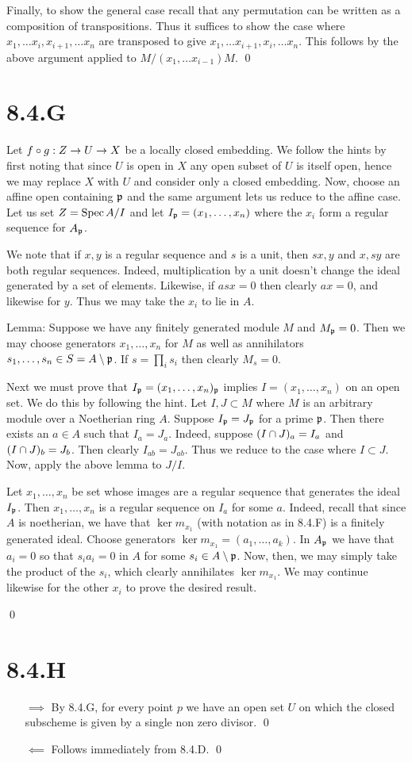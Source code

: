 \documentclass{article}
\begin{document}
Finally, to show the general case recall that any permutation can be written as
a composition of transpositions. Thus it suffices to show the case where
$x_1, \dots x_i, x_{i+1}, \dots x_n$ are transposed to give $x_1, \dots x_{i+1}, x_{i},
    \dots x_n$. This
follows by the above argument applied to $M/(x_1, \dots x_{i-1})M$. \qed

\section{8.4.G}
Let $f \circ g: Z \to U \to X$ be a locally closed embedding. We follow the hints
by first noting that since $U$ is open in
$X$ any open subset of $U$ is itself
open, hence we may replace $X$ with $U$
and consider only a closed embedding. Now, choose an affine open containing
$\mathfrak{p}$ and the same argument lets us reduce to the affine
case. Let us set $Z=\operatorname{Spec} A/I$ and let $I_{\mathfrak{p}}=(x_1, \dots, x_n)$ where
the $x_i$ form a regular sequence for
$A_{\mathfrak{p}}$.

We note that if $x, y$ is a regular sequence and
$s$ is a unit, then $sx, y$ and
$x, sy$ are both regular sequences. Indeed, multiplication by a
unit doesn't change the ideal generated by a set of elements. Likewise, if
$asx=0$ then clearly $ax=0$, and likewise for
$y$. Thus we may take the $x_i$ to lie in
$A$.

Lemma: Suppose we have any finitely generated module $M$
and $M_{\mathfrak{p}}=0$. Then we may choose generators
$x_1, \dots, x_n$ for $M$ as well as annihilators
$s_1, \dots, s_n \in S = A \setminus \mathfrak{p}$. If $s=\prod_i s_i$ then clearly
$M_s=0$.

Next we must prove that $I_{\mathfrak{p}}=(x_1, \dots,
    x_n)_{\mathfrak{p}}$ implies $I=(x_1, \dots, x_n)$
on an open set. We do this by following the hint. Let $I, J \subset M$
where $M$ is an arbitrary module over a Noetherian ring
$A$. Suppose $I_{\mathfrak{p}}=J_{\mathfrak{p}}$ for a prime
$\mathfrak{p}$. Then there exists an $a \in A$ such that
$I_a=J_a$. Indeed, suppose $(I \cap J)_a=I_a$ and
$(I \cap J)_b=J_b$. Then clearly $I_{ab}=J_{ab}$. Thus we reduce
to the case where $I \subset J$. Now, apply the above lemma to
$J/I$.

Let $x_1, \dots, x_n$ be set whose images are a regular sequence that
generates the ideal $I_{\mathfrak{p}}$. Then $x_1, \dots, x_n$ is a
regular sequence on $I_a$ for some $a$.
Indeed, recall that since $A$ is noetherian, we have that
$\ker m_{x_1}$ (with notation as in 8.4.F) is a finitely generated
ideal. Choose generators $\ker m_{x_1}=(a_1, \dots, a_k)$. In $A_{\mathfrak{p}}$ we
have that $a_i=0$ so that $s_ia_i=0$ in
$A$ for some $s_i \in A \setminus \mathfrak{p}$. Now, then, we may
simply take the product of the $s_i$, which clearly
annihilates $\ker m_{x_1}$. We may continue likewise for the other
$x_i$ to prove the desired result.

\qed

\section{8.4.H}
\begin{itemize}
    \item[$\implies$] By 8.4.G, for every point $p$ we have an open set
        $U$ on which the closed subscheme is given by a single non
        zero divisor. \qed
    \item[$\impliedby$] Follows immediately from 8.4.D. \qed
\end{itemize}
\end{document}
